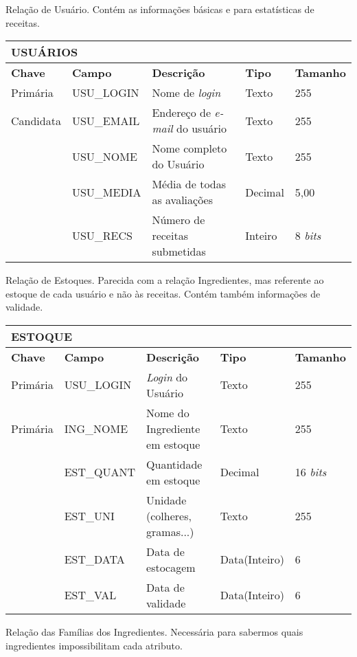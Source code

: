 \documentclass[a4paper]{article}
\begin{document}
\newpage

Relação de Usuário. Contém as informações básicas e para estatísticas de receitas.

\begin{center}
\begin{tabular}{ l | l || l | l l }
  \multicolumn{5}{l}{\textbf{USUÁRIOS}} \\
  \hline
  \textbf{Chave} & \textbf{Campo} & \textbf{Descrição} & \textbf{Tipo} & \textbf{Tamanho} \\
  \cline{1-5}
   Primária & USU\_LOGIN & Nome de \emph{login} & Texto & 255 \\
   Candidata & USU\_EMAIL & Endereço de \emph{e-mail} do usuário & Texto & 255 \\
   & USU\_NOME & Nome completo do Usuário & Texto & 255 \\
   & USU\_MEDIA & Média de todas as avaliações & Decimal & 5,00 \\
   & USU\_RECS & Número de receitas submetidas & Inteiro & 8 \emph{bits}
\end{tabular}
\end{center}

Relação de Estoques. Parecida com a relação Ingredientes, mas referente ao estoque de cada usuário e não às receitas. Contém também informações de validade.

\begin{center}
\begin{tabular}{ l | l || l | l l }
  \multicolumn{5}{l}{\textbf{ESTOQUE}} \\
  \hline
  \textbf{Chave} & \textbf{Campo} & \textbf{Descrição} & \textbf{Tipo} & \textbf{Tamanho} \\
  \cline{1-5}
  Primária & USU\_LOGIN & \emph{Login} do Usuário & Texto & 255 \\
  Primária & ING\_NOME & Nome do Ingrediente em estoque & Texto & 255 \\
   & EST\_QUANT & Quantidade em estoque & Decimal & 16 \emph{bits} \\
   & EST\_UNI & Unidade (colheres, gramas...) & Texto & 255 \\
   & EST\_DATA & Data de estocagem & Data(Inteiro) & 6 \\
   & EST\_VAL & Data de validade & Data(Inteiro) & 6
\end{tabular}
\end{center}

Relação das Famílias dos Ingredientes. Necessária para sabermos quais ingredientes impossibilitam cada atributo.
\end{document}
